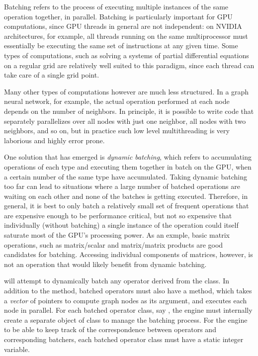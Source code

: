 Batching refers to the process of executing multiple instances of the same operation together, in parallel. 
Batching is particularly important for GPU computations, since GPU threads in general are not independent: 
on NVIDIA architectures, for example, all threads running on the same multiprocessor must essentially 
be executing the same set of instructions at any given time. Some types of computations, such as 
solving a systems of partial differential equations on a regular grid are relatively well suited to this 
paradigm, since each thread can take care of a single grid point.

Many other types of computations however are much less structured. 
In a graph neural network, for example, the actual operation performed at each node depends 
on the number of neighbors. In principle, it is possible to write code that 
separately parallelizes over all nodes 
with just one neighbor, all nodes with two neighbors, and so on, 
but in practice such low level multithreading is very laborious and highly error prone. 

One solution that has emerged is \emph{dynamic batching}, which refers to accumulating operations of each 
type and executing them together in batch on the GPU, when a certain number of the same type have accumulated. 
Taking dynamic batching too far can lead to situations where a large number of batched operations 
are waiting on each other and none of the batches is getting executed. 
Therefore, in general, it is best to only batch a relatively small set of frequent operations that are 
expensive enough to be performance critical, but not so expensive that individually (without batching) 
a single instance of the operation could itself saturate most of the GPU's processing power. 
As an exmple, basic matrix operations, such as matrix/scalar and matrix/matrix products are good candidates 
for batching. Accessing individual components of matrices, however, is not an operation that would 
likely benefit from dynamic batching. 

\Cengine{} will attempt to dynamically batch any operator derived from the  class. 
In addition to the  method, batched operators must also have a  method, 
which takes a \emph{vector} of pointers to compute graph nodes as its argument, and executes 
each node in parallel. For each batched operator class, say , the engine must internally 
create a separate object of class  to manage the batching process. 
For the engine to be able to 
keep track of the correspondence between operators and corresponding batchers, each batched operator 
class must have a static integer  variable. 

